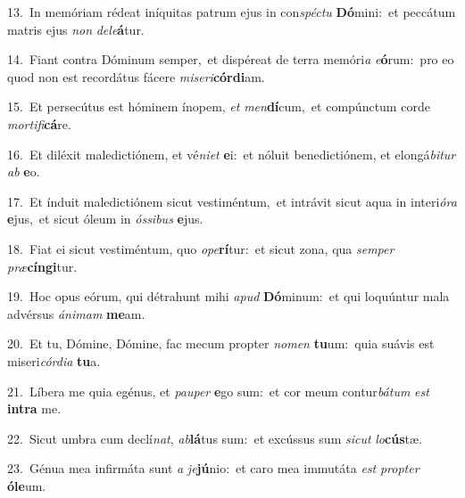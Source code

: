 {\numbfont\textcolor{\numbcolor}{13.}}~In memóriam rédeat iníquitas patrum ejus in con\-\textit{spéc}\-\textit{tu} \textbf{Dó}\-mini:~\star et peccátum matris ejus \textit{non} \textit{de}\-\textit{le}\textbf{á}tur.\par
{\numbfont\textcolor{\numbcolor}{14.}}~Fiant contra Dóminum semper,~\dagger et dispéreat de terra memóri\textit{a} \textit{e}\-\textbf{ó}rum:~\star pro eo quod non est recordátus fácere \textit{mi}\-\textit{se}\textit{ri}\textbf{cór}\textbf{di}am.\par
{\numbfont\textcolor{\numbcolor}{15.}}~Et persecútus est hóminem ínopem, \textit{et} \textit{men}\-\textbf{dí}cum,~\star et compúnctum corde \textit{mor}\-\textit{ti}\textit{fi}\textbf{cá}re.\par
{\numbfont\textcolor{\numbcolor}{16.}}~Et diléxit maledictiónem, et vé\-\textit{ni}\-\textit{et} \textbf{e}\-i:~\star et nóluit benedictiónem, et elongá\-\textit{bi}\-\textit{tur} \textit{ab} \textbf{e}\-o.\par
{\numbfont\textcolor{\numbcolor}{17.}}~Et índuit maledictiónem sicut vestiméntum,~\dagger et intrávit sicut aqua in interi\-\textit{ó}\-\textit{ra} \textbf{e}\-jus,~\star et sicut óleum in \textit{ós}\-\textit{si}\textit{bus} \textbf{e}\-jus.\par
{\numbfont\textcolor{\numbcolor}{18.}}~Fiat ei sicut vestiméntum, quo \textit{o}\-\textit{pe}\textbf{rí}tur:~\star et sicut zona, qua \textit{sem}\-\textit{per} \textit{præ}\-\textbf{cín}\textbf{gi}tur.\par
{\numbfont\textcolor{\numbcolor}{19.}}~Hoc opus eórum, qui détrahunt mihi \textit{a}\-\textit{pud} \textbf{Dó}\-minum:~\star et qui loquúntur mala advérsus \textit{á}\-\textit{ni}\textit{mam} \textbf{me}\-am.\par
{\numbfont\textcolor{\numbcolor}{20.}}~Et tu, Dómine, Dómine, fac mecum propter \textit{no}\-\textit{men} \textbf{tu}\-um:~\star quia suávis est miseri\-\textit{cór}\-\textit{di}\textit{a} \textbf{tu}\-a.\par
{\numbfont\textcolor{\numbcolor}{21.}}~Líbera me quia egénus, et \textit{pau}\-\textit{per} \textbf{e}\-go sum:~\star et cor meum contur\-\textit{bá}\-\textit{tum} \textit{est} \textbf{in}\-\textbf{tra} me.\par
{\numbfont\textcolor{\numbcolor}{22.}}~Sicut umbra cum declí\-\textit{nat}\-, \textit{ab}\-\textbf{lá}tus sum:~\star et excússus sum \textit{sic}\-\textit{ut} \textit{lo}\-\textbf{cús}tæ.\par
{\numbfont\textcolor{\numbcolor}{23.}}~Génua mea infirmáta sunt \textit{a} \textit{je}\-\textbf{jú}nio:~\star et caro mea immutáta \textit{est} \textit{prop}\-\textit{ter} \textbf{ó}\-\textbf{le}um.\par
